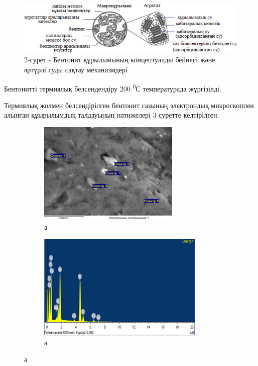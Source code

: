 \begin{figure}[H]
	\centering
	\includegraphics[width=\textwidth]{assets/1044}
	\caption*{2-сурет - Бентонит құрылымының концептуалды бейнесі және әртүрлі суды сақтау механизмдері}
\end{figure}

Бентонитті термиялық белсендендіру 200 \textsuperscript{0}С
температурада жүргізілді.

Термиялық жолмен белсендірілген бентонит сазының электрондық
микроскоппен алынған құырылымдық талдауының нәтижелері 3-суретте
келтірілген.

\begin{figure}[H]
    \centering
    \begin{subfigure}[b]{0.45\textwidth}
        \centering
        \includegraphics[width=\textwidth]{assets/1045}
        \caption*{а}
    \end{subfigure}
    \hfill
    \begin{subfigure}[b]{0.45\textwidth}
        \centering
        \includegraphics[width=\textwidth]{assets/1045.1}
        \caption*{ә}
    \end{subfigure}
\end{figure}

